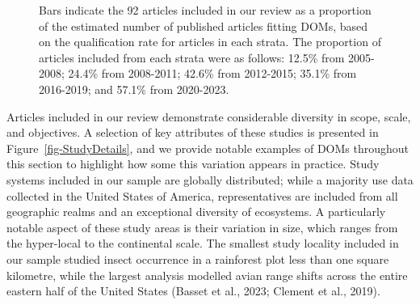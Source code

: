 \documentclass[
]{article}
\begin{document}
\begin{figure}


\caption{\label{fig-coverage}Bars indicate the 92 articles included in
our review as a proportion of the estimated number of published articles
fitting DOMs, based on the qualification rate for articles in each
strata. The proportion of articles included from each strata were as
follows: 12.5\% from 2005-2008; 24.4\% from 2008-2011; 42.6\% from
2012-2015; 35.1\% from 2016-2019; and 57.1\% from 2020-2023.}

\end{figure}%

Articles included in our review demonstrate considerable diversity in
scope, scale, and objectives. A selection of key attributes of these
studies is presented in Figure~\ref{fig-StudyDetails}, and we provide
notable examples of DOMs throughout this section to highlight how some
this variation appears in practice. Study systems included in our sample
are globally distributed; while a majority use data collected in the
United States of America, representatives are included from all
geographic realms and an exceptional diversity of ecosystems. A
particularly notable aspect of these study areas is their variation in
size, which ranges from the hyper-local to the continental scale. The
smallest study locality included in our sample studied insect occurrence
in a rainforest plot less than one square kilometre, while the largest
analysis modelled avian range shifts across the entire eastern half of
the United States (Basset et al., 2023; Clement et al., 2019).
\end{document}
